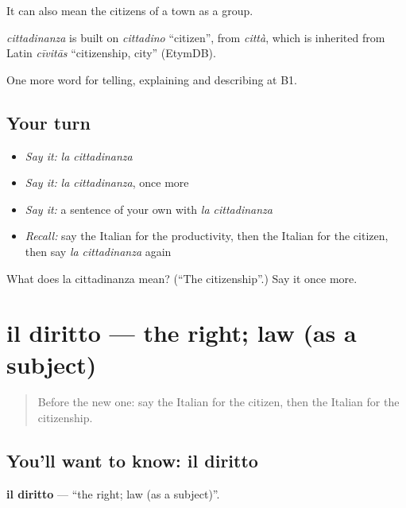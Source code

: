 It can also mean the citizens of a town as a group.

\begin{cousinweb}
\emph{cittadinanza} is built on \emph{cittadino} \textquotedblleft{}citizen\textquotedblright{}, from \emph{città}, which is inherited from Latin \emph{cīvitās} \textquotedblleft{}citizenship, city\textquotedblright{} (EtymDB).
\end{cousinweb}

\begin{grammarlens}[title={What you've built}]
One more word for telling, explaining and describing at B1.
\end{grammarlens}

\subsection*{Your turn}
\begin{itemize}
\raggedright
  \item \emph{Say it:} \emph{la cittadinanza}
  \item \emph{Say it:} \emph{la cittadinanza}, once more
  \item \emph{Say it:} a sentence of your own with \emph{la cittadinanza}
  \item \emph{Recall:} say the Italian for the productivity, then the Italian for the citizen, then say \emph{la cittadinanza} again
\end{itemize}

\begin{tcolorbox}[breakable,colback=teal!4,colframe=teal!35!black,title={Before you move on}]
What does la cittadinanza mean? (\textquotedblleft{}The citizenship\textquotedblright{}.) Say it once more.
\end{tcolorbox}
\section[il diritto]{il diritto — the right; law (as a subject)}

\label{lesson:IT-C363-diritto}



\begin{quote}
Before the new one: say the Italian for the citizen, then the Italian for the citizenship.
\end{quote}

\subsection*{You'll want to know: il diritto}
\textbf{il diritto} — \textquotedblleft{}the right; law (as a subject)\textquotedblright{}.

